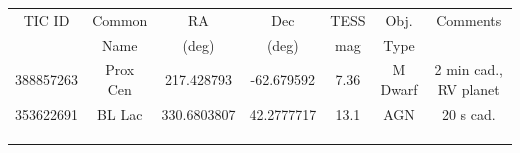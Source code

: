 \documentclass[letterpaper,12pt]{article}
\begin{document}
\begin{center}
\begin{tabular}{ | c | c | c | c | c | c | c | }
\hline
TIC ID          &      Common      &     RA             &      Dec          &      TESS       &       Obj.        &      Comments \\       
                    &      Name           &     (deg)          &      (deg)        &      mag         &       Type       &                         \\     
\hline
\hline
388857263  &  Prox Cen           &  217.428793  &  -62.679592  &  7.36             &    M Dwarf    & 2 min cad., RV planet \\ \hline
353622691  &  BL Lac               &   330.6803807    &   42.2777717    &   13.1  &   AGN            &    20 s cad.                                 \\ \hline
                    &                           &                       &                      &                      &                     &                                     \\ \hline
                    &                           &                       &                      &                      &                     &                                     \\ \hline
                    &                           &                       &                      &                      &                     &                                     \\ \hline
\end{tabular}
\end{center}   

\end{document}
